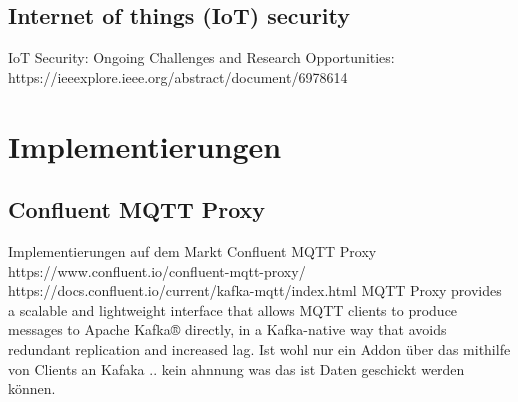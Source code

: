     \subsection{Internet of things (IoT) security}
    IoT Security: Ongoing Challenges and Research Opportunities: https://ieeexplore.ieee.org/abstract/document/6978614
    

\section{Implementierungen}
    \subsection{Confluent MQTT Proxy}
    Implementierungen auf dem Markt
    Confluent MQTT Proxy
    https://www.confluent.io/confluent-mqtt-proxy/
    https://docs.confluent.io/current/kafka-mqtt/index.html
    MQTT Proxy provides a scalable and lightweight interface that allows MQTT clients to produce messages to Apache Kafka® directly, in a Kafka-native way that avoids redundant replication and increased lag.
    Ist wohl nur ein Addon über das mithilfe von Clients an Kafaka .. kein ahnnung was das ist Daten geschickt werden können.
    
